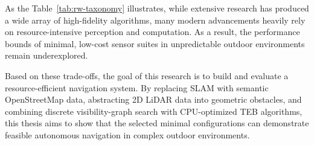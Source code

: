 As the Table~\ref{tab:rw-taxonomy} illustrates, while extensive research has produced a wide array of high-fidelity algorithms, many modern advancements heavily rely on resource-intensive perception and computation. As a result, the performance bounds of minimal, low-cost sensor suites in unpredictable outdoor environments remain underexplored. 

Based on these trade-offs, the goal of this research is to build and evaluate a resource-efficient navigation system. By replacing SLAM with semantic OpenStreetMap data, abstracting 2D LiDAR data into geometric obstacles, and combining discrete visibility-graph search with CPU-optimized TEB algorithms, this thesis aims to show that the selected minimal configurations can demonstrate feasible autonomous navigation in complex outdoor environments.

